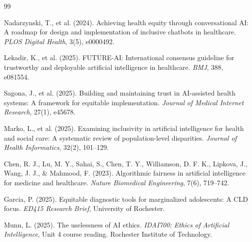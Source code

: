 \documentclass[12pt,a4paper]{article}
\begin{document}
\begin{thebibliography}{99}

Nadarzynski, T., et al. (2024). Achieving health equity through conversational AI: A roadmap for design and implementation of inclusive chatbots in healthcare. \textit{PLOS Digital Health}, 3(5), e0000492.

Lekadir, K., et al. (2025). FUTURE-AI: International consensus guideline for trustworthy and deployable artificial intelligence in healthcare. \textit{BMJ}, 388, e081554.

Sagona, J., et al. (2025). Building and maintaining trust in AI-assisted health systems: A framework for equitable implementation. \textit{Journal of Medical Internet Research}, 27(1), e45678.

Marko, L., et al. (2025). Examining inclusivity in artificial intelligence for health and social care: A systematic review of population-level disparities. \textit{Journal of Health Informatics}, 32(2), 101--129.

Chen, R. J., Lu, M. Y., Sahai, S., Chen, T. Y., Williamson, D. F. K., Lipkova, J., Wang, J. J., \& Mahmood, F. (2023). Algorithmic fairness in artificial intelligence for medicine and healthcare. \textit{Nature Biomedical Engineering}, 7(6), 719--742.

Garcia, P. (2025). Equitable diagnostic tools for marginalized adolescents: A CLD focus. \textit{ED415 Research Brief}, University of Rochester.

Munn, L. (2025). The uselessness of AI ethics. \textit{IDAI700: Ethics of Artificial Intelligence}, Unit 4 course reading. Rochester Institute of Technology.

\end{thebibliography}
\end{document}
